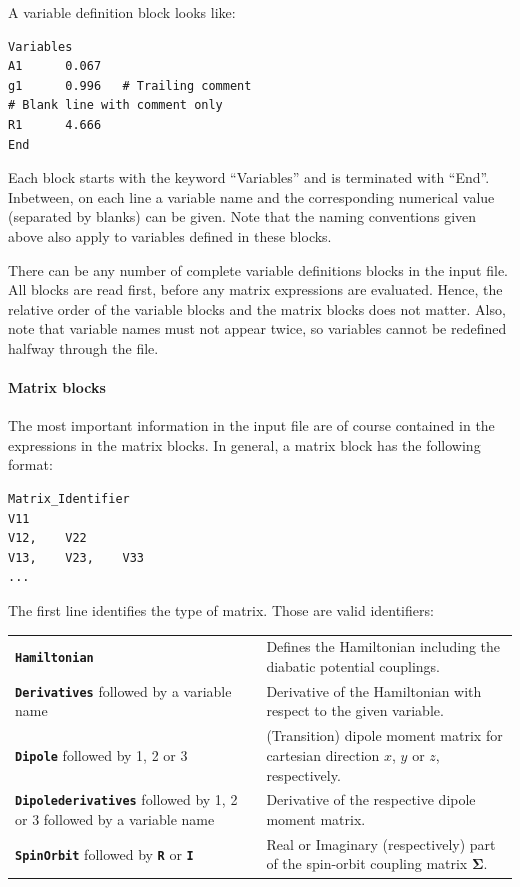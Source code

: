 \documentclass[a4paper,11pt,DIV=15,openany,twoside=false]{scrbook}
\newcommand{\ttt}[1]{\textbf{\texttt{#1}}}
\newenvironment{example}{
  \vspace{0mm}
  \definecolor{shadecolor}{HTML}{BBDDFF}
  \begin{shaded}
  \begin{minipage}{0.9\textwidth}
}{
  \end{minipage}
  \end{shaded}
}
\begin{document}
A variable definition block looks like:
\begin{example}
  \begin{verbatim}
Variables
A1      0.067
g1      0.996   # Trailing comment
# Blank line with comment only
R1      4.666
End
  \end{verbatim}
\end{example}
Each block starts with the keyword ``Variables'' and is terminated with ``End''. Inbetween, on each line a variable name and the corresponding numerical value (separated by blanks) can be given. Note that the naming conventions given above also apply to variables defined in these blocks. 

There can be any number of complete variable definitions blocks in the input file. All blocks are read first, before any matrix expressions are evaluated. Hence, the relative order of the variable blocks and the matrix blocks does not matter. Also, note that variable names must not appear twice, so variables cannot be redefined halfway through the file.

\paragraph{Matrix blocks}

The most important information in the input file are of course contained in the expressions in the matrix blocks. In general, a matrix block has the following format:
\begin{example}
  \begin{verbatim}
Matrix_Identifier
V11
V12,    V22
V13,    V23,    V33
...
  \end{verbatim}
\end{example}
The first line identifies the type of matrix. Those are valid identifiers:

\begin{tabular}{p{5cm}p{9cm}}
\ttt{Hamiltonian}                               &Defines the Hamiltonian including the diabatic potential couplings.\\
\ttt{Derivatives} followed by a variable name   &Derivative of the Hamiltonian with respect to the given variable.\\
\ttt{Dipole} followed by 1, 2 or 3              &(Transition) dipole moment matrix for cartesian direction $x$, $y$ or $z$, respectively.\\
\ttt{Dipolederivatives} followed by 1, 2 or 3 followed by a variable name       &Derivative of the respective dipole moment matrix.\\
\ttt{SpinOrbit} followed by \ttt{R} or \ttt{I}  &Real or Imaginary (respectively) part of the spin-orbit coupling matrix $\boldsymbol{\Sigma}$.\\
\end{tabular}
\end{document}
